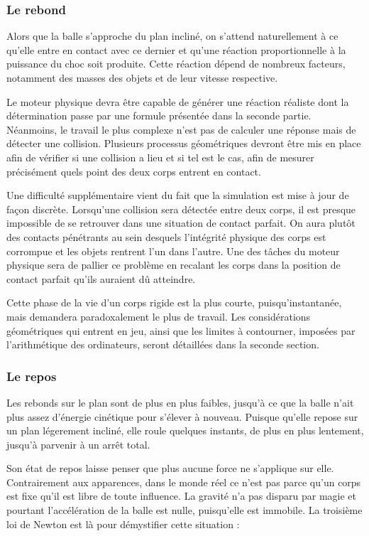 \subsubsection{Le rebond}

Alors que la balle s'approche du plan incliné, on s'attend naturellement à ce qu'elle entre en contact avec ce dernier et qu'une réaction proportionnelle à la puissance du choc soit produite. Cette réaction dépend de nombreux facteurs, notamment des masses des objets et de leur vitesse respective.

Le moteur physique devra être capable de générer une réaction réaliste dont la détermination passe par une formule présentée dans la seconde partie. Néanmoins, le travail le plus complexe n'est pas de calculer une réponse mais de détecter une collision. Plusieurs processus géométriques devront être mis en place afin de vérifier si une collision a lieu et si tel est le cas, afin de mesurer précisément quels point des deux corps entrent en contact.

Une difficulté supplémentaire vient du fait que la simulation est mise à jour de façon discrète. Lorsqu'une collision sera détectée entre deux corps, il est presque impossible de se retrouver dans une situation de contact parfait. On aura plutôt des contacts pénétrants au sein desquels l'intégrité physique des corps est corrompue et les objets rentrent l'un dans l'autre. Une des tâches du moteur physique sera de pallier ce problème en recalant les corps dans la position de contact parfait qu'ils auraient dû atteindre.

Cette phase de la vie d'un corps rigide est la plus courte, puisqu'instantanée, mais demandera paradoxalement le plus de travail. Les considérations géométriques qui entrent en jeu, ainsi que les limites à contourner, imposées par l'arithmétique des ordinateurs, seront détaillées dans la seconde section.

\subsubsection{Le repos}

Les rebonds sur le plan sont de plus en plus faibles, jusqu'à ce que la balle n'ait plus assez d'énergie cinétique pour s'élever à nouveau. Puisque qu'elle repose sur un plan légerement incliné, elle roule quelques instants, de plus en plus lentement, jusqu'à parvenir à un arrêt total.

Son état de repos laisse penser que plus aucune force ne s'applique sur elle. Contrairement aux apparences, dans le monde réel ce n'est pas parce qu'un corps est fixe qu'il est libre de toute influence. La gravité n'a pas disparu par magie et pourtant l'accélération de la balle est nulle, puisqu'elle est immobile. La troisième loi de Newton est là pour démystifier cette situation :


